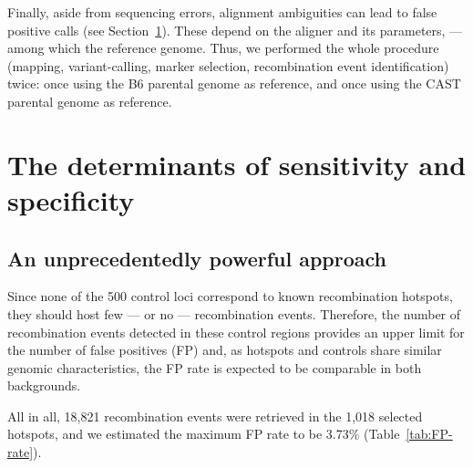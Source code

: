 Finally, aside from sequencing errors, alignment ambiguities can lead to false positive calls (see Section~\ref{sec:determinants}).
These depend on the aligner and its parameters, — among which the reference genome.
Thus, we performed the whole procedure (mapping, variant-calling, marker selection, recombination event identification) twice: once using the B6 parental genome as reference, and once using the CAST parental genome as reference.


\section{The determinants of sensitivity and specificity}
\label{sec:determinants}

\subsection{An unprecedentedly powerful approach}


Since none of the 500 control loci correspond to known recombination hotspots, they should host few — or no — recombination events. 
Therefore, the number of recombination events detected in these control regions provides an upper limit for the number of false positives (FP) and, as hotspots and controls share similar genomic characteristics, the FP rate is expected to be comparable in both backgrounds.

All in all, 18,821 recombination events were retrieved in the 1,018 selected hotspots, and we estimated the maximum FP rate to be 3.73\% (Table~\ref{tab:FP-rate}).




